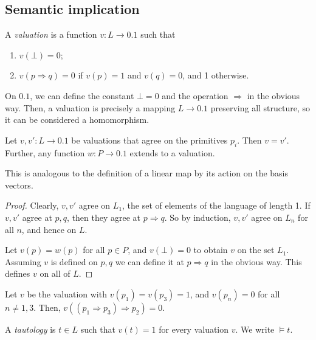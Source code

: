 \subsection{Semantic implication}
\begin{definition}
    A \emph{valuation} is a function \( v \colon L \to \qty{0,1} \) such that
    \begin{enumerate}
        \item \( v(\bot) = 0 \);
        \item \( v(p \Rightarrow q) = 0 \) if \( v(p) = 1 \) and \( v(q) = 0 \), and 1 otherwise.
    \end{enumerate}
\end{definition}
\begin{remark}
    On \( \qty{0,1} \), we can define the constant \( \bot = 0 \) and the operation \( \Rightarrow \) in the obvious way.
    Then, a valuation is precisely a mapping \( L \to \qty{0,1} \) preserving all structure, so it can be considered a homomorphism.
\end{remark}
\begin{proposition}
    Let \( v, v' \colon L \to \qty{0,1} \) be valuations that agree on the primitives \( p_i \).
    Then \( v = v' \).
    Further, any function \( w \colon P \to \qty{0,1} \) extends to a valuation.
\end{proposition}
\begin{remark}
    This is analogous to the definition of a linear map by its action on the basis vectors.
\end{remark}
\begin{proof}
    Clearly, \( v, v' \) agree on \( L_1 \), the set of elements of the language of length 1.
    If \( v, v' \) agree at \( p, q \), then they agree at \( p \Rightarrow q \).
    So by induction, \( v, v' \) agree on \( L_n \) for all \( n \), and hence on \( L \).

    Let \( v(p) = w(p) \) for all \( p \in P \), and \( v(\bot) = 0 \) to obtain \( v \) on the set \( L_1 \).
    Assuming \( v \) is defined on \( p, q \) we can define it at \( p \Rightarrow q \) in the obvious way.
    This defines \( v \) on all of \( L \).
\end{proof}
\begin{example}
    Let \( v \) be the valuation with \( v(p_1) = v(p_3) = 1 \), and \( v(p_n) = 0 \) for all \( n \neq 1, 3 \).
    Then, \( v((p_1 \Rightarrow p_3) \Rightarrow p_2) = 0 \).
\end{example}
\begin{definition}
    A \emph{tautology} is \( t \in L \) such that \( v(t) = 1 \) for every valuation \( v \).
    We write \( \models t \).
\end{definition}
